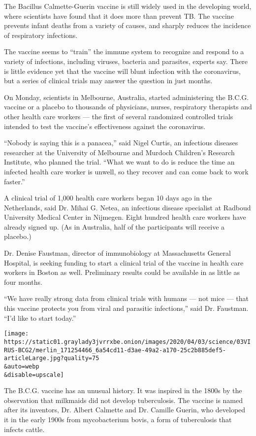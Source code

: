 The Bacillus Calmette-Guerin vaccine is still widely used in the
developing world, where scientists have found that it does more than
prevent TB. The vaccine prevents infant deaths from a variety of causes,
and sharply reduces the incidence of respiratory infections.

The vaccine seems to ``train'' the immune system to recognize and
respond to a variety of infections, including viruses, bacteria and
parasites, experts say. There is little evidence yet that the vaccine
will blunt infection with the coronavirus, but a series of clinical
trials may answer the question in just months.

On Monday, scientists in Melbourne, Australia, started administering the
B.C.G. vaccine or a placebo to thousands of physicians, nurses,
respiratory therapists and other health care workers --- the first of
several randomized controlled trials intended to test the vaccine's
effectiveness against the coronavirus.

``Nobody is saying this is a panacea,'' said Nigel Curtis, an infectious
diseases researcher at the University of Melbourne and Murdoch
Children's Research Institute, who planned the trial. ``What we want to
do is reduce the time an infected health care worker is unwell, so they
recover and can come back to work faster.''

A clinical trial of 1,000 health care workers began 10 days ago in the
Netherlands, said Dr. Mihai G. Netea, an infectious disease specialist
at Radboud University Medical Center in Nijmegen. Eight hundred health
care workers have already signed up. (As in Australia, half of the
participants will receive a placebo.)

Dr. Denise Faustman, director of immunobiology at Massachusetts General
Hospital, is seeking funding to start a clinical trial of the vaccine in
health care workers in Boston as well. Preliminary results could be
available in as little as four months.

``We have really strong data from clinical trials with humans --- not
mice --- that this vaccine protects you from viral and parasitic
infections,'' said Dr. Faustman. ``I'd like to start today.''

\texttt{[image: https://static01.graylady3jvrrxbe.onion/images/2020/04/03/science/03VIRUS-BCG2/merlin\_171254466\_6a54cd11-d3ae-49a2-a170-25c2b885def5-articleLarge.jpg?quality=75\\\&auto=webp\\\&disable=upscale]}

The B.C.G. vaccine has an unusual history. It was inspired in the 1800s
by the observation that milkmaids did not develop tuberculosis. The
vaccine is named after its inventors, Dr. Albert Calmette and Dr.
Camille Guerin, who developed it in the early 1900s from mycobacterium
bovis, a form of tuberculosis that infects cattle.

